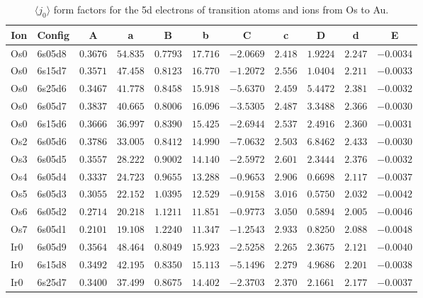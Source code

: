 \begin{table}[H]
 \caption{$\langle j_0\rangle$ form factors for the 5d electrons of transition atoms and ions from Os to Au.\cite{kob:11}}
 \label{5dj0b}
 \vspace{1ex}
{ \tablesize
\begin{tabular}{llrrrrrrrrr}
\hline
\multicolumn{1}{c}{ Ion}&\multicolumn{1}{c}{ Config}&\multicolumn{1}{c}{ A }&\multicolumn{1}{c}{  a }&\multicolumn{1}{c}{B }&\multicolumn{1}{c}{ b }&\multicolumn{1}{c}{ C }&\multicolumn{1}{c}{ c }&\multicolumn{1}{c}{ D }&\multicolumn{1}{c}{ d }&\multicolumn{1}{c}{E}\\
\hline
Os0 & 6s05d8 &$0.3676$ &$54.835$ &$0.7793$ &$17.716$ &$-2.0669$ &$2.418$ &$1.9224$ &$2.247$ &$-0.0034$ \\
Os0 & 6s15d7 &$0.3571$ &$47.458$ &$0.8123$ &$16.770$ &$-1.2072$ &$2.556$ &$1.0404$ &$2.211$ &$-0.0033$ \\
Os0 & 6s25d6 &$0.3467$ &$41.778$ &$0.8458$ &$15.918$ &$-5.6370$ &$2.459$ &$5.4472$ &$2.381$ &$-0.0032$ \\
Os0 & 6s05d7 &$0.3837$ &$40.665$ &$0.8006$ &$16.096$ &$-3.5305$ &$2.487$ &$3.3488$ &$2.366$ &$-0.0030$ \\
Os0 & 6s15d6 &$0.3666$ &$36.997$ &$0.8390$ &$15.425$ &$-2.6944$ &$2.537$ &$2.4916$ &$2.360$ &$-0.0031$ \\
Os2 & 6s05d6 &$0.3786$ &$33.005$ &$0.8412$ &$14.990$ &$-7.0632$ &$2.503$ &$6.8462$ &$2.433$ &$-0.0030$ \\
Os3 & 6s05d5 &$0.3557$ &$28.222$ &$0.9002$ &$14.140$ &$-2.5972$ &$2.601$ &$2.3444$ &$2.376$ &$-0.0032$ \\
Os4 & 6s05d4 &$0.3337$ &$24.723$ &$0.9655$ &$13.288$ &$-0.9653$ &$2.906$ &$0.6698$ &$2.117$ &$-0.0037$ \\
Os5 & 6s05d3 &$0.3055$ &$22.152$ &$1.0395$ &$12.529$ &$-0.9158$ &$3.016$ &$0.5750$ &$2.032$ &$-0.0042$ \\
Os6 & 6s05d2 &$0.2714$ &$20.218$ &$1.1211$ &$11.851$ &$-0.9773$ &$3.050$ &$0.5894$ &$2.005$ &$-0.0046$ \\
Os7 & 6s05d1 &$0.2101$ &$19.108$ &$1.2240$ &$11.347$ &$-1.2543$ &$2.933$ &$0.8250$ &$2.088$ &$-0.0048$ \\
Ir0 & 6s05d9 &$0.3564$ &$48.464$ &$0.8049$ &$15.923$ &$-2.5258$ &$2.265$ &$2.3675$ &$2.121$ &$-0.0040$ \\
Ir0 & 6s15d8 &$0.3492$ &$42.195$ &$0.8350$ &$15.113$ &$-5.1496$ &$2.279$ &$4.9686$ &$2.201$ &$-0.0038$ \\
Ir0 & 6s25d7 &$0.3400$ &$37.499$ &$0.8675$ &$14.402$ &$-2.3703$ &$2.370$ &$2.1661$ &$2.177$ &$-0.0037$ \\

\end{tabular}}
\end{table}
